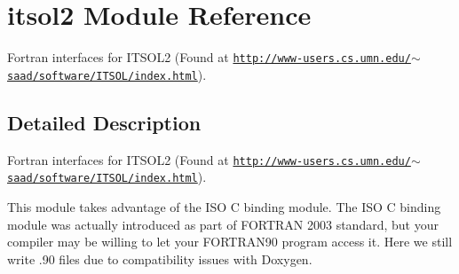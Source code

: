 \hypertarget{namespaceitsol2}{}\section{itsol2 Module Reference}
\label{namespaceitsol2}


Fortran interfaces for I\+T\+S\+O\+L2 (Found at \href{http://www-users.cs.umn.edu/~saad/software/ITSOL/index.html}{\tt http\+://www-\/users.\+cs.\+umn.\+edu/$\sim$saad/software/\+I\+T\+S\+O\+L/index.\+html}).  




\subsection{Detailed Description}
Fortran interfaces for I\+T\+S\+O\+L2 (Found at \href{http://www-users.cs.umn.edu/~saad/software/ITSOL/index.html}{\tt http\+://www-\/users.\+cs.\+umn.\+edu/$\sim$saad/software/\+I\+T\+S\+O\+L/index.\+html}). 

This module takes advantage of the I\+S\+O C binding module. The I\+S\+O C binding module was actually introduced as part of F\+O\+R\+T\+R\+A\+N 2003 standard, but your compiler may be willing to let your F\+O\+R\+T\+R\+A\+N90 program access it. Here we still write .90 files due to compatibility issues with Doxygen. 